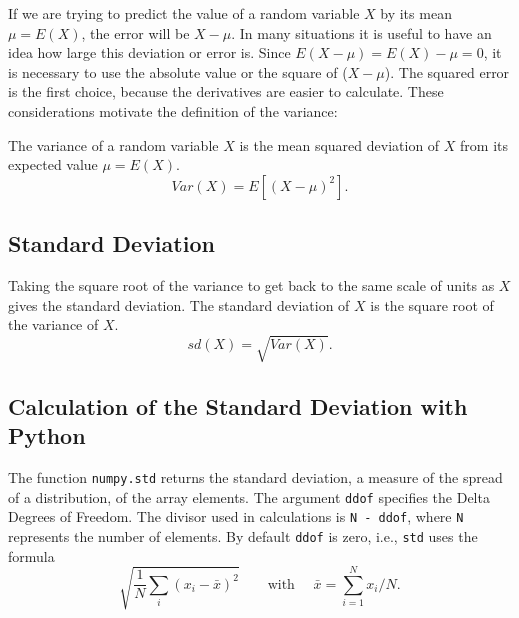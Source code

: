 \documentclass[
  letterpaper,
  DIV=11,
  numbers=noendperiod]{scrreprt}
\begin{document}
If we are trying to predict the value of a random variable \(X\) by its
mean \(\mu = E(X)\), the error will be \(X-\mu\). In many situations it
is useful to have an idea how large this deviation or error is. Since
\(E(X-\mu) = E(X) -\mu = 0\), it is necessary to use the absolute value
or the square of (\(X-\mu\)). The squared error is the first choice,
because the derivatives are easier to calculate. These considerations
motivate the definition of the variance:

The variance of a random variable \(X\) is the mean squared deviation of
\(X\) from its expected value \(\mu = E(X)\). \begin{equation}
Var(X) = E[ (X-\mu)^2].
\end{equation}

\subsection{Standard Deviation}\label{standard-deviation}

Taking the square root of the variance to get back to the same scale of
units as \(X\) gives the standard deviation. The standard deviation of
\(X\) is the square root of the variance of \(X\). \begin{equation}
sd(X) = \sqrt{Var(X)}.
\end{equation}

\subsection{Calculation of the Standard Deviation with
Python}\label{calculation-of-the-standard-deviation-with-python}

The function \texttt{numpy.std} returns the standard deviation, a
measure of the spread of a distribution, of the array elements. The
argument \texttt{ddof} specifies the Delta Degrees of Freedom. The
divisor used in calculations is \texttt{N\ -\ ddof}, where \texttt{N}
represents the number of elements. By default \texttt{ddof} is zero,
i.e., \texttt{std} uses the formula
\begin{equation}  \sqrt{  \frac{1}{N} \sum_i \left( x_i - \bar{x} \right)^2  } \qquad \text{with } \quad \bar{x} = \sum_{i=1}^N x_i /N. \end{equation}
\end{document}
